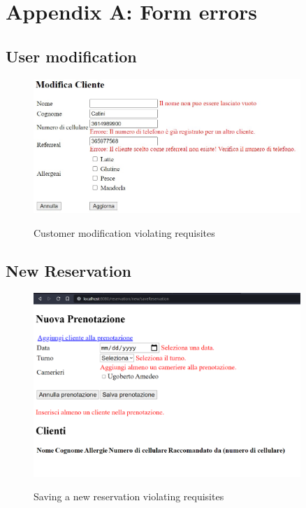 \documentclass{article}
\begin{document}
    \newpage
    \section*{Appendix A: Form errors}


    \vspace*{5mm}

    \subsection*{User modification}
    \begin{figure}[H]
        \centering
        \includegraphics[width=0.9\textwidth]{images/customer_validation_error.jpg}
        \label{fig:customer_validation_error}
        \caption{Customer modification violating requisites}
    \end{figure}

    \vspace*{5mm}

    \subsection*{New Reservation}
    \label{sec:new_reservation_form_errors}
    \begin{figure}[H]
        \centering
        \includegraphics[width=0.9\textwidth]{images/new_reservation_form_errors}
        \label{fig:new_reservation_form_errors}
        \caption{Saving a new reservation violating requisites}
    \end{figure}
\end{document}
